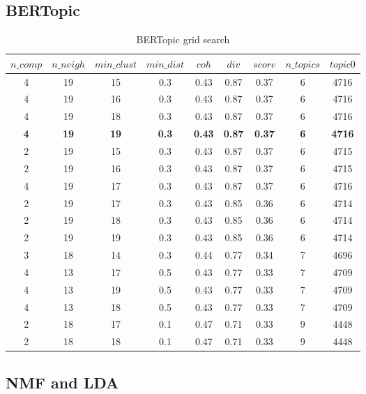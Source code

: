 \documentclass{article}
\begin{document}
\subsection{BERTopic} \label{app:grid_bert}

\begin{table}[htbp]
\centering
\begin{tabular}{ccccccccc}
\toprule
$n\_comp$ & $n\_neigh$ & $min\_clust$ & $min\_dist$ & $coh$ & $div$ & $score$ & $n\_topics$ & $topic0$ \\
\midrule
4 & 19 & 15 & 0.3 & 0.43 & 0.87 & 0.37 & 6 & 4716 \\
4 & 19 & 16 & 0.3 & 0.43 & 0.87 & 0.37 & 6 & 4716 \\
4 & 19 & 18 & 0.3 & 0.43 & 0.87 & 0.37 & 6 & 4716 \\
\textbf{4} & \textbf{19} & \textbf{19} & \textbf{0.3} & \textbf{0.43} & \textbf{0.87} & \textbf{0.37} & \textbf{6} & \textbf{4716} \\
2 & 19 & 15 & 0.3 & 0.43 & 0.87 & 0.37 & 6 & 4715 \\
2 & 19 & 16 & 0.3 & 0.43 & 0.87 & 0.37 & 6 & 4715 \\
4 & 19 & 17 & 0.3 & 0.43 & 0.87 & 0.37 & 6 & 4716 \\
2 & 19 & 17 & 0.3 & 0.43 & 0.85 & 0.36 & 6 & 4714 \\
2 & 19 & 18 & 0.3 & 0.43 & 0.85 & 0.36 & 6 & 4714 \\
2 & 19 & 19 & 0.3 & 0.43 & 0.85 & 0.36 & 6 & 4714 \\
3 & 18 & 14 & 0.3 & 0.44 & 0.77 & 0.34 & 7 & 4696 \\
4 & 13 & 17 & 0.5 & 0.43 & 0.77 & 0.33 & 7 & 4709 \\
4 & 13 & 19 & 0.5 & 0.43 & 0.77 & 0.33 & 7 & 4709 \\
4 & 13 & 18 & 0.5 & 0.43 & 0.77 & 0.33 & 7 & 4709 \\
2 & 18 & 17 & 0.1 & 0.47 & 0.71 & 0.33 & 9 & 4448 \\
2 & 18 & 18 & 0.1 & 0.47 & 0.71 & 0.33 & 9 & 4448 \\
\bottomrule
\end{tabular}
\caption{BERTopic grid search}
\label{tab:bertopic_grid}
\end{table}

\subsection{NMF and LDA} \label{app:grid_nmf}
\end{document}
